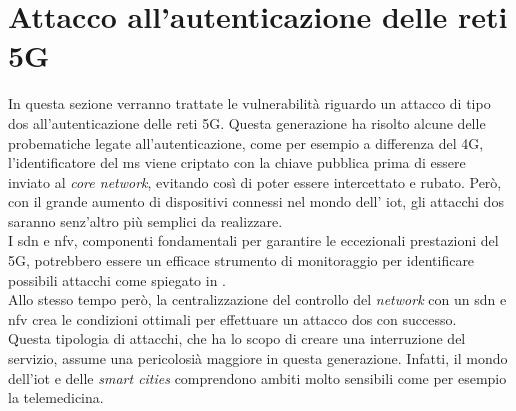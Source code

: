 \chapter{Attacco all'autenticazione delle reti 5G}
In questa sezione verranno trattate le vulnerabilità riguardo un attacco di tipo \gls{dos} all'autenticazione delle reti 5G.
Questa generazione ha risolto alcune delle probematiche legate all'autenticazione, come per esempio a differenza del 4G, l'identificatore 
del \gls{ms} viene criptato con la chiave pubblica prima di essere inviato al \textit{core network}, evitando così di poter essere intercettato e rubato\cite{5g-vs-4g}.
Però, con il grande aumento di dispositivi connessi nel mondo dell' \gls{iot}, gli attacchi \gls{dos} saranno senz'altro più 
semplici da realizzare.\\
I \gls{sdn} e \gls{nfv}, componenti fondamentali per garantire le eccezionali prestazioni del 5G, potrebbero essere un efficace strumento di monitoraggio per identificare possibili 
attacchi come spiegato in \cite{dos-detection-with-sdn}.\\
Allo stesso tempo però, la centralizzazione del controllo del \textit{network} con un \gls{sdn} e \gls{nfv} crea le condizioni ottimali per effettuare un attacco \gls{dos} con successo\cite{5g-dos}.\\
Questa tipologia di attacchi, che ha lo scopo di creare una interruzione del servizio, assume una pericolosià maggiore in questa generazione. Infatti, il mondo dell'\gls{iot} e delle \textit{smart cities} comprendono 
ambiti molto sensibili come per esempio la telemedicina.

\clearpage

